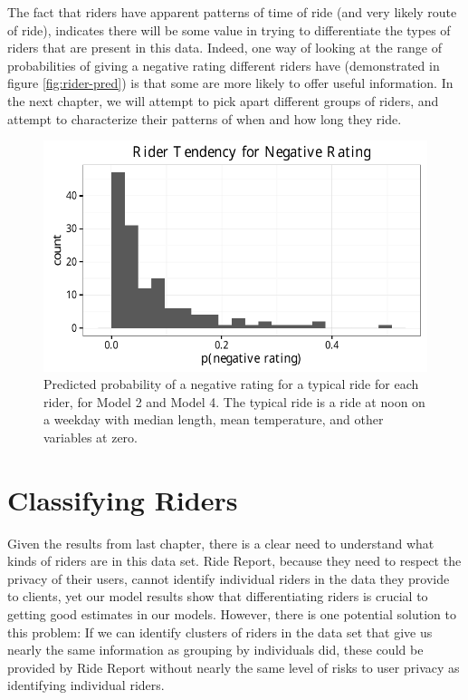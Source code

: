 \documentclass[12pt,twoside]{reedthesis}
\begin{document}
  The fact that riders have apparent patterns of time of ride (and very
  likely route of ride), indicates there will be some value in trying to
  differentiate the types of riders that are present in this data. Indeed,
  one way of looking at the range of probabilities of giving a negative
  rating different riders have (demonstrated in figure
  \autoref{fig:rider-pred}) is that some are more likely to offer useful
  information. In the next chapter, we will attempt to pick apart
  different groups of riders, and attempt to characterize their patterns
  of when and how long they ride.
  
  \begin{figure}[tbh]
  \centering
  \includegraphics[angle = 0,scale = 1]{figure/rider_predictions.pdf}
  \caption[Predicted probability of a negative rating for a typical ride for 
  each rider, for Model 2 and Model 4. The typical ride is a ride at noon on a 
  weekday with median length, mean temperature, and other variables at zero.]{\normalsize{Predicted probability of a negative rating for a typical ride for 
  each rider, for Model 2 and Model 4. The typical ride is a ride at noon on a 
  weekday with median length, mean temperature, and other variables at zero.}}
  \label{fig:rider-pred}
  \end{figure}
  
  \chapter{Classifying Riders}\label{classifying-riders}
  
  Given the results from last chapter, there is a clear need to understand
  what kinds of riders are in this data set. Ride Report, because they
  need to respect the privacy of their users, cannot identify individual
  riders in the data they provide to clients, yet our model results show
  that differentiating riders is crucial to getting good estimates in our
  models. However, there is one potential solution to this problem: If we
  can identify clusters of riders in the data set that give us nearly the
  same information as grouping by individuals did, these could be provided
  by Ride Report without nearly the same level of risks to user privacy as
  identifying individual riders.
  
\end{document}
